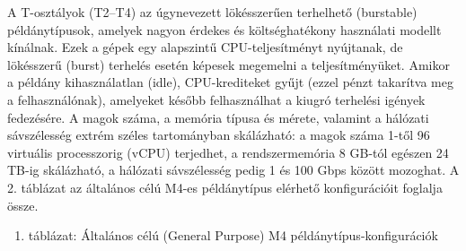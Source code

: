 \documentclass[
]{article}
\providecommand{\tightlist}{%
  \setlength{\itemsep}{0pt}\setlength{\parskip}{0pt}}
\begin{document}
A T-osztályok (T2--T4) az úgynevezett lökésszerűen terhelhető
(burstable) példánytípusok, amelyek nagyon érdekes és költséghatékony
használati modellt kínálnak. Ezek a gépek egy alapszintű
CPU-teljesítményt nyújtanak, de lökésszerű (burst) terhelés esetén
képesek megemelni a teljesítményüket. Amikor a példány kihasználatlan
(idle), CPU-krediteket gyűjt (ezzel pénzt takarítva meg a
felhasználónak), amelyeket később felhasználhat a kiugró terhelési
igények fedezésére. A magok száma, a memória típusa és mérete, valamint
a hálózati sávszélesség extrém széles tartományban skálázható: a magok
száma 1-től 96 virtuális processzorig (vCPU) terjedhet, a
rendszermemória 8 GB-tól egészen 24 TB-ig skálázható, a hálózati
sávszélesség pedig 1 és 100 Gbps között mozoghat. A 2. táblázat az
általános célú M4-es példánytípus elérhető konfigurációit foglalja
össze.

\begin{enumerate}
\def\labelenumi{\arabic{enumi}.}
\setcounter{enumi}{1}
\tightlist
\item
  táblázat: Általános célú (General Purpose) M4
  példánytípus-konfigurációk
\end{enumerate}
\end{document}
